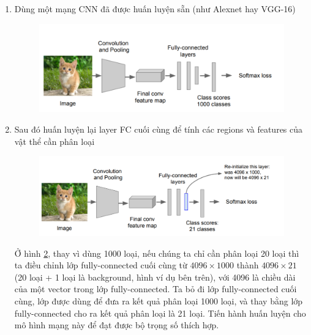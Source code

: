 \begin{enumerate}
    \item Dùng một mạng CNN đã được huấn luyện sẵn (như Alexnet hay VGG-16)
    \begin{center}
    	\begin{figure}[H]
	    \centering
	    \includegraphics[width=0.8\columnwidth]{images/chap2/rcnn_1.png}
	    \label{fig:2.28}
	    \end{figure}
	\end{center}
    \item Sau đó huấn luyện lại layer FC cuối cùng để tính các regions và features của vật thể cần phân loại
    \begin{center}
    	\begin{figure}[H]
	    \centering
	    \includegraphics[width=0.8\columnwidth]{images/chap2/rcnn_2.png}
	    \label{fig:2.29}
	    \end{figure}
	\end{center}
	Ở hình \ref{fig:2.29}, thay vì dùng 1000 loại, nếu chúng ta chỉ cần phân loại 20 loại thì ta điều chỉnh lớp fully-connected cuối cùng từ $4096 \times 1000$ thành $4096 \times 21$ (20 loại + 1 loại là background, hình ví dụ bên trên), với 4096 là chiều dài của một vector trong lớp fully-connected. Ta bỏ đi lớp fully-connected cuối cùng, lớp được dùng để đưa ra kết quả phân loại 1000 loại, và thay bằng lớp fully-connected cho ra kết quả phân loại là 21 loại. Tiến hành huấn luyện cho mô hình mạng này để đạt được bộ trọng số thích hợp.

\end{enumerate}
